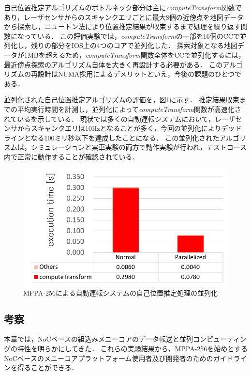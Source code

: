 \documentclass[submit,techrep]{ipsj_v2/UTF8/ipsj}
\begin{document}
自己位置推定アルゴリズムのボトルネック部分は主に\emph{computeTransform}関数であり，レーザセンサからのスキャンクエリごとに最大8個の近傍点を地図データから探索し，ニュートン法により位置推定結果が収束するまで処理を繰り返す関数になっている．
この評価実験では，\emph{computeTransform}の一部を16個のCCで並列化し，残りの部分をIOS上の4つのコアで並列化した．
探索対象となる地図データが1MBを超えるため，\emph{computeTransform}関数全体をCCで並列化するには，最近傍点探索のアルゴリズム自体を大きく再設計する必要がある．
このアルゴリズムの再設計はNUMA採用によるデメリットといえ，今後の課題のひとつである．

並列化された自己位置推定アルゴリズムの評価を，図\ref{fig:ndt_matching}に示す．
推定結果収束までの平均実行時間を計測し，並列化によって\emph{computeTransform}関数が高速化されているを示している．
現状では多くの自動運転システムにおいて，レーザセンサからスキャンクエリは10Hzとなることが多く，今回の並列化によりデッドラインとなる100ミリ秒以下を達成したことになる．
この並列化されたアルゴリズムは，シミュレーションと実車実験の両方で動作実験が行われ，テストコース内で正常に動作することが確認されている．

\begin{figure}[t]
  \centering
  \includegraphics[width=0.9\linewidth]{../figure/BarGraph_ndt_matching.pdf}
  \caption{\label{fig:ndt_matching}
  MPPA-256による自動運転システムの自己位置推定処理の並列化}
\end{figure}


\subsection{考察}
\label{sec:lessons}
本章では，NoCベースの組込みメニーコアのデータ転送と並列コンピューティングの特性を明らかにしてきた．
これらの実験結果から，MPPA-256を始めとするNoCベースのメニーコアプラットフォーム使用者及び開発者のためのガイドラインを得ることができる．
\end{document}
